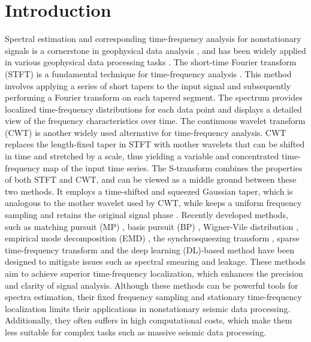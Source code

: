 \section{Introduction}

Spectral estimation and corresponding time-frequency analysis for
nonstationary signals is a cornerstone in geophysical data
analysis \cite[]{Tary2014}, and has been widely applied in various
geophysical data processing
tasks \cite[]{Tan2022,Yao2022,Bai2022,Mohammadigheymasi2022,chen2021}. The
short-time Fourier transform (STFT) is a fundamental technique for
time-frequency analysis \cite[]{Allen77,liu2016stft,lu2013stft}. This
method involves applying a series of short tapers to the input signal
and subsequently performing a Fourier transform on each tapered
segment. The spectrum provides localized time-frequency distributions
for each data point and displays a detailed view of the frequency
characteristics over time. The continuous wavelet transform
(CWT) \cite[]{Chakraborty95} is another widely used alternative for
time-frequency analysis. CWT replaces the length-fixed taper in STFT
with mother wavelets that can be shifted in time and stretched by a
scale, thus yielding a variable and concentrated time-frequency map of
the input time series. The
S-transform \cite[]{Stockwell96,liu2019st,Wu2023} combines the
properties of both STFT and CWT, and can be viewed as a middle ground
between these two methods. It employs a time-shifted and squeezed
Gaussian taper, which is analogous to the mother wavelet used by CWT,
while keeps a uniform frequency sampling and retains the original
signal phase \cite{stockwell2007}. Recently developed methods, such as
matching pursuit (MP) \cite{mallat1993}, basis pursuit
(BP) \cite[]{chen2001}, Wigner-Vile
distribution \cite[]{Boashash1987}, empirical mode decomposition
(EMD) \cite[]{huang1998emd,flandrin2004emd,Zhang2020}, the
synchrosqueezing transform \cite[]{daubechies2011}, sparse
time-frequency transform \cite[]{gholami2012sparse,yang2021sparse} and
the deep learning (DL)-based
method \cite[]{liu2023NN,Qian2022,Yang2022} have been designed to
mitigate issues such as spectral smearing and leakage. These methods
aim to achieve superior time-frequency localization, which enhances
the precision and clarity of signal analysis. Although these methods
can be powerful tools for spectra estimation, their fixed frequency
sampling and stationary time-frequency localization limits their
applications in nonstationary seismic data processing. Additionally,
they often suffers in high computational costs, which make them less
suitable for complex tasks such as massive seismic data processing.

